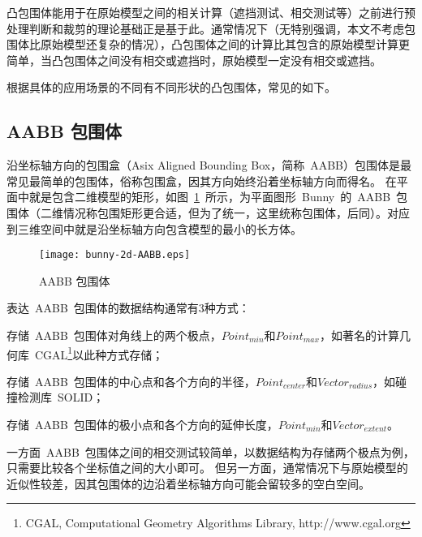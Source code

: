 凸包围体能用于在原始模型之间的相关计算（遮挡测试、相交测试等）之前进行预处理判断和裁剪的理论基础正是基于此。通常情况下（无特别强调，本文不考虑包围体比原始模型还复杂的情况），凸包围体之间的计算比其包含的原始模型计算更简单，当凸包围体之间没有相交或遮挡时，原始模型一定没有相交或遮挡。

根据具体的应用场景的不同有不同形状的凸包围体，常见的如下。

\subsection{AABB 包围体}

沿坐标轴方向的包围盒（Asix Aligned Bounding Box，简称~AABB）包围体是最常见最简单的包围体，俗称包围盒，因其方向始终沿着坐标轴方向\cite{bergen1997efficient}而得名。
在平面中就是包含二维模型的矩形，如图~\ref{fig:aabb-bunny}~所示，为平面图形~Bunny~的~AABB~包围体（二维情况称包围矩形更合适，但为了统一，这里统称包围体，后同）。对应到三维空间中就是沿坐标轴方向包含模型的最小的长方体。
\begin{figure}[htbp] %
  \centering
  \texttt{[image: bunny-2d-AABB.eps]}
  \caption{AABB 包围体}
  \label{fig:aabb-bunny}
\end{figure}

表达~AABB~包围体的数据结构通常有3种方式：\\ \indent
\begin{inparaenum}[(1)]
\item 存储~AABB~包围体对角线上的两个极点，$Point_{min}$和$Point_{max}$，如著名的计算几何库~CGAL\footnote{CGAL, Computational Geometry Algorithms Library, http://www.cgal.org}以此种方式存储；\\ \indent
\item 存储~AABB~包围体的中心点和各个方向的半径，$Point_{center}$和$Vector_{radius}$，如碰撞检测库~SOLID\cite{bergen1997efficient}；\\ \indent
\item 存储~AABB~包围体的极小点和各个方向的延伸长度\cite{ericson2005real}，$Point_{min}$和$Vector_{extent}$。
\end{inparaenum} 

一方面~AABB~包围体之间的相交测试较简单，以数据结构为存储两个极点为例，只需要比较各个坐标值之间的大小即可。
但另一方面，通常情况下与原始模型的近似性较差，因其包围体的边沿着坐标轴方向可能会留较多的空白空间。

